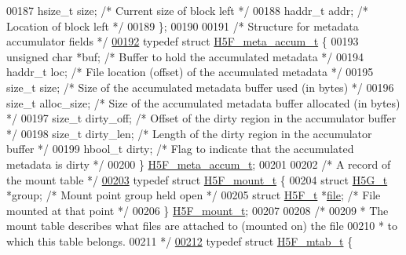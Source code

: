 \begin{DoxyCode}
00187     hsize\_t             size;           \textcolor{comment}{/* Current size of block left */}
00188     haddr\_t             addr;           \textcolor{comment}{/* Location of block left */}
00189 \};
00190 
00191 \textcolor{comment}{/* Structure for metadata accumulator fields */}
\hyperlink{struct_h5_f__meta__accum__t}{00192} \textcolor{keyword}{typedef} \textcolor{keyword}{struct }\hyperlink{struct_h5_f__meta__accum__t}{H5F\_meta\_accum\_t} \{
00193     \textcolor{keywordtype}{unsigned} \textcolor{keywordtype}{char}      *buf;            \textcolor{comment}{/* Buffer to hold the accumulated metadata */}
00194     haddr\_t             loc;            \textcolor{comment}{/* File location (offset) of the accumulated metadata */}
00195     \textcolor{keywordtype}{size\_t}              size;           \textcolor{comment}{/* Size of the accumulated metadata buffer used (in bytes) */}
00196     \textcolor{keywordtype}{size\_t}              alloc\_size;     \textcolor{comment}{/* Size of the accumulated metadata buffer allocated (in bytes) */}
00197     \textcolor{keywordtype}{size\_t}              dirty\_off;      \textcolor{comment}{/* Offset of the dirty region in the accumulator buffer */}
00198     \textcolor{keywordtype}{size\_t}              dirty\_len;      \textcolor{comment}{/* Length of the dirty region in the accumulator buffer */}
00199     hbool\_t             dirty;          \textcolor{comment}{/* Flag to indicate that the accumulated metadata is dirty */}
00200 \} \hyperlink{struct_h5_f__meta__accum__t}{H5F\_meta\_accum\_t};
00201 
00202 \textcolor{comment}{/* A record of the mount table */}
\hyperlink{struct_h5_f__mount__t}{00203} \textcolor{keyword}{typedef} \textcolor{keyword}{struct }\hyperlink{struct_h5_f__mount__t}{H5F\_mount\_t} \{
00204     \textcolor{keyword}{struct }\hyperlink{struct_h5_g__t}{H5G\_t}   *group; \textcolor{comment}{/* Mount point group held open      */}
00205     \textcolor{keyword}{struct }\hyperlink{struct_h5_f__t}{H5F\_t}   *\hyperlink{structfile}{file};  \textcolor{comment}{/* File mounted at that point       */}
00206 \} \hyperlink{struct_h5_f__mount__t}{H5F\_mount\_t};
00207 
00208 \textcolor{comment}{/*}
00209 \textcolor{comment}{ * The mount table describes what files are attached to (mounted on) the file}
00210 \textcolor{comment}{ * to which this table belongs.}
00211 \textcolor{comment}{ */}
\hyperlink{struct_h5_f__mtab__t}{00212} \textcolor{keyword}{typedef} \textcolor{keyword}{struct }\hyperlink{struct_h5_f__mtab__t}{H5F\_mtab\_t} \{

\end{DoxyCode}
